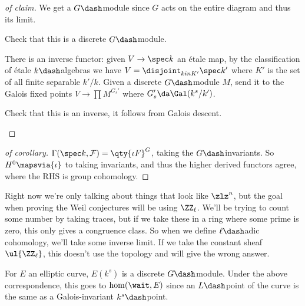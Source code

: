 \begin{proof}[of claim]

We get a \(G\dash\)module since \(G\) acts on the entire diagram and
thus its limit.

\begin{exercise}[?]

Check that this is a discrete \(G\dash\)module.

\end{exercise}

There is an inverse functor: given \(V\to \spec k\) an étale map, by the
classification of étale \(k\dash\)algebras we have
\(V = \disjoint_{k in K'} \spec k'\) where \(K'\) is the set of all
finite separable \(k'/k\). Given a discrete \(G\dash\)module \(M\), send
it to the Galois fixed points \(V \to \prod M^{G_s'}\) where
\(G_s' \da \Gal(k^s/k')\).

\begin{exercise}[Check]

Check that this is an inverse, it follows from Galois descent.

\end{exercise}

\end{proof}

\begin{proof}[of corollary]

\(\Gamma(\spec k, \mathcal{F}) = \qty{\iota F}^G\), taking the
\(G\dash\)invariants. So \(H^0 \mapsvia{\iota}\) to taking invariants,
and thus the higher derived functors agree, where the RHS is group
cohomology.

\end{proof}

\begin{remark}

Right now we're only talking about things that look like \(\zlz^n\), but
the goal when proving the Weil conjectures will be using \(\ZZ_\ell\).
We'll be trying to count some number by taking traces, but if we take
these in a ring where some prime is zero, this only gives a congruence
class. So when we define \(\ell\dash\)adic cohomology, we'll take some
inverse limit. If we take the constant sheaf \(\ul{\ZZ_\ell}\), this
doesn't use the topology and will give the wrong answer.

\end{remark}

\begin{example}[?]

For \(E\) an elliptic curve, \(E(k^s)\) is a discrete \(G\dash\)module.
Under the above correspondence, this goes to \(\hom(\wait, E)\) since an
\(L\dash\)point of the curve is the same as a Galois-invariant
\(k^s\dash\)point.

\end{example}

